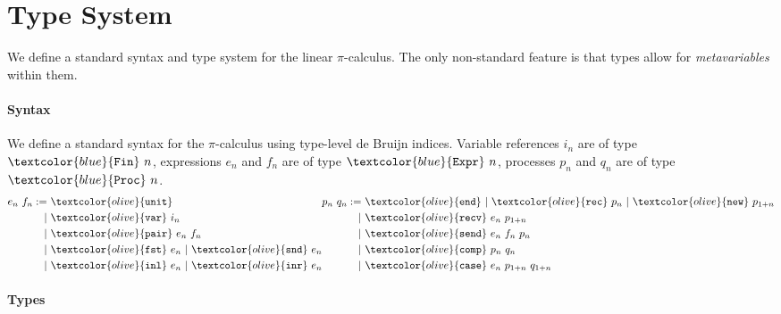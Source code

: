 \documentclass[sigplan,screen,review]{acmart}
\newcommand{\picalc}{$\pi$-calculus}
\newcommand{\constr}[1]{\textcolor{olive}{\mathtt{#1}}}
\newcommand{\type}[1]{\textcolor{blue}{\mathtt{#1}}}
\newcommand{\Fin}[1]{\type{Fin}~#1}
\newcommand{\sExpr}[1]{\type{Expr}~#1}
\newcommand{\sProc}[1]{\type{Proc}~#1}
\newcommand{\sunit}{\constr{unit}}
\newcommand{\svar}{\constr{var}}
\newcommand{\sfst}{\constr{fst}}
\newcommand{\ssnd}{\constr{snd}}
\newcommand{\sinl}{\constr{inl}}
\newcommand{\sinr}{\constr{inr}}
\newcommand{\spair}{\constr{pair}}
\newcommand{\send}{\constr{end}}
\newcommand{\snew}{\constr{new}}
\newcommand{\scomp}{\constr{comp}}
\newcommand{\srecv}{\constr{recv}}
\newcommand{\ssend}{\constr{send}}
\newcommand{\scase}{\constr{case}}
\newcommand{\srec}{\constr{rec}}
\begin{document}
\section{Type System}
\label{type-system}

We define a standard syntax and type system for the linear \picalc{}.
The only non-standard feature is that types allow for \emph{metavariables} within them.

\paragraph{Syntax}

We define a standard syntax for the \picalc{} using type-level de Bruijn indices.
Variable references $i_n$ are of type $\Fin{n}$, expressions $e_n$ and $f_n$ are of type $\sExpr{n}$, processes $p_n$ and $q_n$ are of type $\sProc{n}$.
\[
\begin{aligned}[c]
  e_n ~ f_n  :=
  &~ \sunit \\
  |&~ \svar~i_n \\
  |&~ \spair~e_n~f_n \\
  |&~ \sfst~e_n ~|~  \ssnd~e_n \\
  |&~ \sinl~e_n ~|~  \sinr~e_n
\end{aligned}
\begin{aligned}[c]
  p_n ~ q_n  :=
  &~ \send ~|~  \srec~p_n ~|~ \snew~p_{1+n} \\
  |&~ \srecv~e_n~p_{1+n} \\
  |&~ \ssend~e_n~f_n~p_n \\
  |&~ \scomp~p_n~q_n \\
  |&~ \scase~e_n~p_{1+n}~q_{1+n} \\
\end{aligned}
\]

\paragraph{Types}
\label{types}
\end{document}
